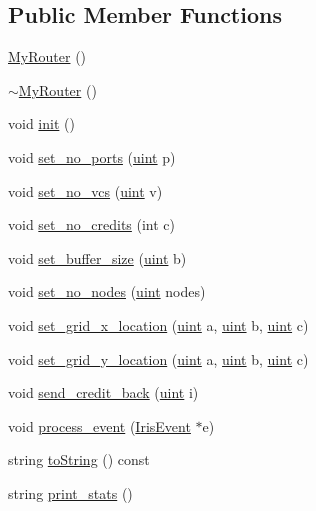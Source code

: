 \subsection*{Public Member Functions}
\begin{CompactItemize}
\item 
\hyperlink{classMyRouter_22ab97be4fbffe1aa4e33bd5cd470167}{MyRouter} ()
\item 
\hyperlink{classMyRouter_3ffe36f3427a8beeb62007909ece9dc8}{$\sim$MyRouter} ()
\item 
void \hyperlink{classMyRouter_8c9be5d944c7cb4c98f3b833e614274c}{init} ()
\item 
void \hyperlink{classMyRouter_ce1887c47f021ee3a26f678f00939bf0}{set\_\-no\_\-ports} (\hyperlink{outputBuffer_8h_91ad9478d81a7aaf2593e8d9c3d06a14}{uint} p)
\item 
void \hyperlink{classMyRouter_b7a91b2d68f0ad85e1ae3801111985c9}{set\_\-no\_\-vcs} (\hyperlink{outputBuffer_8h_91ad9478d81a7aaf2593e8d9c3d06a14}{uint} v)
\item 
void \hyperlink{classMyRouter_1136c71870bd451ac24db24612071c92}{set\_\-no\_\-credits} (int c)
\item 
void \hyperlink{classMyRouter_ee56704d0e9366dae6c26bdf90bc6343}{set\_\-buffer\_\-size} (\hyperlink{outputBuffer_8h_91ad9478d81a7aaf2593e8d9c3d06a14}{uint} b)
\item 
void \hyperlink{classMyRouter_ceb204776c6ed1fcbc0179b1d57e0ba3}{set\_\-no\_\-nodes} (\hyperlink{outputBuffer_8h_91ad9478d81a7aaf2593e8d9c3d06a14}{uint} nodes)
\item 
void \hyperlink{classMyRouter_684adfcb9dd9421f75372fe59b8ccc5f}{set\_\-grid\_\-x\_\-location} (\hyperlink{outputBuffer_8h_91ad9478d81a7aaf2593e8d9c3d06a14}{uint} a, \hyperlink{outputBuffer_8h_91ad9478d81a7aaf2593e8d9c3d06a14}{uint} b, \hyperlink{outputBuffer_8h_91ad9478d81a7aaf2593e8d9c3d06a14}{uint} c)
\item 
void \hyperlink{classMyRouter_c5edbdd2f7da6b24f941540e687706c0}{set\_\-grid\_\-y\_\-location} (\hyperlink{outputBuffer_8h_91ad9478d81a7aaf2593e8d9c3d06a14}{uint} a, \hyperlink{outputBuffer_8h_91ad9478d81a7aaf2593e8d9c3d06a14}{uint} b, \hyperlink{outputBuffer_8h_91ad9478d81a7aaf2593e8d9c3d06a14}{uint} c)
\item 
void \hyperlink{classMyRouter_bcfd73d0faaa8a191cd4ece957f3773b}{send\_\-credit\_\-back} (\hyperlink{outputBuffer_8h_91ad9478d81a7aaf2593e8d9c3d06a14}{uint} i)
\item 
void \hyperlink{classMyRouter_5dcfef46ad281c05de8e8c1bdf236a4a}{process\_\-event} (\hyperlink{classIrisEvent}{IrisEvent} $\ast$e)
\item 
string \hyperlink{classMyRouter_9b40e1d62a4638fb84f31aff143d970d}{toString} () const 
\item 
string \hyperlink{classMyRouter_ce28b171a1f2f93fa96f9d6a65fadbbe}{print\_\-stats} ()
\end{CompactItemize}
